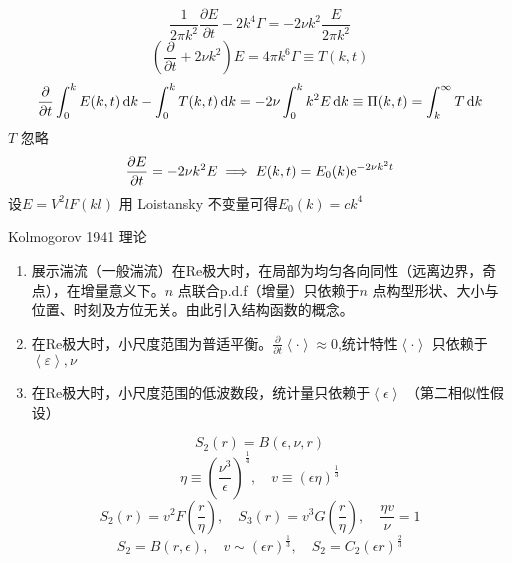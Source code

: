 \documentclass[12pt]{ctexart}
\begin{document}
\begin{equation}
   \frac{1}{2\pi k^2} \frac{\partial E}{\partial t}  - 2k^4 \Gamma = -2 \nu k^2 \frac{E}{2\pi k^2}
\end{equation}
\begin{equation}
   \left( \frac{\partial }{\partial t} + 2\nu k^2 \right) E = 4\pi k^6 \Gamma \equiv T(k,t) 
\end{equation}
\begin{equation}
   \frac{\partial }{\partial t} \int_0^k E(k,t) \dif k - \int_0^k T(k,t)\dif k = -2 \nu \int_0^k k^2 E \dif k \equiv \Pi(k,t) = \int_k^{\infty} T \dif k
\end{equation}
$T$ 忽略
\begin{equation}
   \frac{\partial E}{\partial t} = -2 \nu k^2 E \implies E(k,t) = E_0(k) \mathrm{e}^{-2\nu k^2t}
\end{equation}
设$E = V^2 l F(kl)$ 用 Loistansky 不变量可得$ E_0(k) = ck^4$

Kolmogorov 1941 理论

\begin{enumerate}
   \item 展示湍流（一般湍流）在Re极大时，在局部为均匀各向同性（远离边界，奇点），在增量意义下。$n$ 点联合p.d.f（增量）只依赖于$n$ 点构型形状、大小与位置、时刻及方位无关。由此引入结构函数的概念。
   \item 在Re极大时，小尺度范围为普适平衡。$ \frac{\partial }{\partial t} \left<\cdot \right> \approx 0$,统计特性$\left<\cdot \right>$ 只依赖于$\left<\varepsilon\right>,\nu$
   \item 在Re极大时，小尺度范围的低波数段，统计量只依赖于$\left<\epsilon \right>$ （第二相似性假设）
\end{enumerate}
\begin{equation}
   S_2(r) = B(\epsilon, \nu, r)
\end{equation}
\begin{equation}
   \eta \equiv \left( \frac{\nu^3}{\epsilon} \right) ^{\frac{1}{4}},\quad v \equiv (\epsilon \eta)^{\frac{1}{3}}
\end{equation}
\begin{equation}
   S_2(r) = v^2 F \left( \frac{r}{\eta} \right),\quad S_3(r) = v^3 G(\frac{r}{\eta}),\quad \frac{\eta v}{\nu} = 1
\end{equation}
\begin{equation}
   S_2 = B(r,\epsilon),\quad v \sim (\epsilon r)^{\frac{1}{3}},\quad S_2 = C_2 (\epsilon r)^{\frac{2}{3}}
\end{equation}
\end{document}
